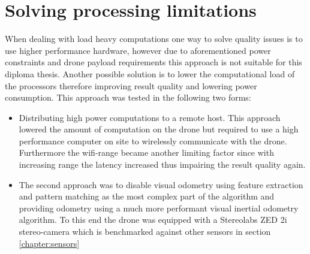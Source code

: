 \section{Solving processing limitations}
When dealing with load heavy computations one way to solve quality issues is to use higher performance hardware, however due to aforementioned power constraints and drone payload requirements this approach is not suitable for this diploma thesis. 
Another possible solution is to lower the computational load of the processors therefore improving result quality and lowering power consumption. 
This approach was tested in the following two forms:
\begin{itemize}
	
	\item Distributing high power computations to a remote host. This approach lowered the amount of computation on the drone but required to use a high performance computer on site to wirelessly communicate with the drone. Furthermore the wifi-range became another limiting factor since with increasing range the latency increased thus impairing the result quality again.
	
	\item The second approach was to disable visual odometry using feature extraction and pattern matching as the most complex part of the algorithm and providing odometry using a much more performant visual inertial odometry algorithm. To this end the drone was equipped with a Stereolabs ZED 2i stereo-camera which is benchmarked against other sensors in section \ref{chapter:sensors}%
\end{itemize}

